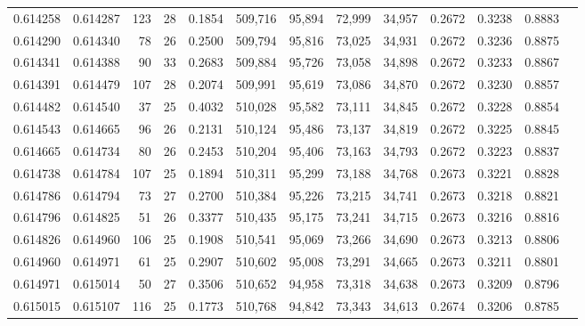 \begin{tabular}{rrrrrrrrrrrrr}
0.614258 & 0.614287 & 123 &  28 &                                     0.1854 & 509,716 &  95,894 &  72,999 &  34,957 & 0.2672 & 0.3238 & 0.8883 \\
0.614290 & 0.614340 &  78 &  26 &                                     0.2500 & 509,794 &  95,816 &  73,025 &  34,931 & 0.2672 & 0.3236 & 0.8875 \\
0.614341 & 0.614388 &  90 &  33 &                                     0.2683 & 509,884 &  95,726 &  73,058 &  34,898 & 0.2672 & 0.3233 & 0.8867 \\
0.614391 & 0.614479 & 107 &  28 &                                     0.2074 & 509,991 &  95,619 &  73,086 &  34,870 & 0.2672 & 0.3230 & 0.8857 \\
0.614482 & 0.614540 &  37 &  25 &                                     0.4032 & 510,028 &  95,582 &  73,111 &  34,845 & 0.2672 & 0.3228 & 0.8854 \\
0.614543 & 0.614665 &  96 &  26 &                                     0.2131 & 510,124 &  95,486 &  73,137 &  34,819 & 0.2672 & 0.3225 & 0.8845 \\
0.614665 & 0.614734 &  80 &  26 &                                     0.2453 & 510,204 &  95,406 &  73,163 &  34,793 & 0.2672 & 0.3223 & 0.8837 \\
0.614738 & 0.614784 & 107 &  25 &                                     0.1894 & 510,311 &  95,299 &  73,188 &  34,768 & 0.2673 & 0.3221 & 0.8828 \\
0.614786 & 0.614794 &  73 &  27 &                                     0.2700 & 510,384 &  95,226 &  73,215 &  34,741 & 0.2673 & 0.3218 & 0.8821 \\
0.614796 & 0.614825 &  51 &  26 &                                     0.3377 & 510,435 &  95,175 &  73,241 &  34,715 & 0.2673 & 0.3216 & 0.8816 \\
0.614826 & 0.614960 & 106 &  25 &                                     0.1908 & 510,541 &  95,069 &  73,266 &  34,690 & 0.2673 & 0.3213 & 0.8806 \\
0.614960 & 0.614971 &  61 &  25 &                                     0.2907 & 510,602 &  95,008 &  73,291 &  34,665 & 0.2673 & 0.3211 & 0.8801 \\
0.614971 & 0.615014 &  50 &  27 &                                     0.3506 & 510,652 &  94,958 &  73,318 &  34,638 & 0.2673 & 0.3209 & 0.8796 \\
0.615015 & 0.615107 & 116 &  25 &                                     0.1773 & 510,768 &  94,842 &  73,343 &  34,613 & 0.2674 & 0.3206 & 0.8785 \\

\end{tabular}
